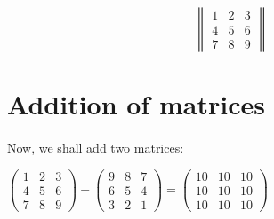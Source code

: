 \documentclass{article}
\begin{document}
\[
\begin{Vmatrix}
	1&2&3\\
	4&5&6\\
	7&8&9
\end{Vmatrix}
\]

\section{Addition of matrices}
\paragraph{}
Now, we shall add two matrices:

$\begin{pmatrix}
	1&2&3\\
	4&5&6\\
	7&8&9
\end{pmatrix}
+
\begin{pmatrix}
	9&8&7\\
	6&5&4\\
	3&2&1
\end{pmatrix}
=
\begin{pmatrix}
	10&10&10\\
	10&10&10\\
	10&10&10
\end{pmatrix}
$
\end{document}
